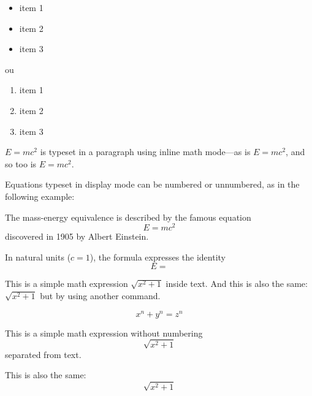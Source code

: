 \documentclass[12pt]{article}
\begin{document}

\begin{itemize}
    \item item 1
    \item item 2
    \item item 3
\end{itemize}

ou

\begin{enumerate}
    \item item 1
    \item item 2
    \item item 3
\end{enumerate}




\begin{math}
    E=mc^2
\end{math}
is typeset in a paragraph using inline math mode---as is $E=mc^2$, and so too is \(E=mc^2\).

Equations typeset in display mode can be numbered or unnumbered, as in the following example:

The mass-energy equivalence is described by the famous equation
\[ E=mc^2 \] discovered in 1905 by Albert Einstein. 

In natural units ($c = 1$), the formula expresses the identity
\begin{equation}
E=                              %
\end{equation}

This is a simple math expression \(\sqrt{x^2+1}\) inside text. 
And this is also the same: 
\begin{math}
\sqrt{x^2+1}
\end{math}
but by using another command.

\[ x^n + y^n = z^n \]


This is a simple math expression without numbering
\[\sqrt{x^2+1}\] 
separated from text.

This is also the same:
\begin{displaymath}
\sqrt{x^2+1}
\end{displaymath}
\end{document}

